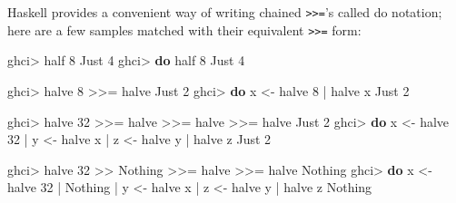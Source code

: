 \documentclass[]{article}
\newenvironment{Shaded}{}{}
\newcommand{\DataTypeTok}[1]{\textcolor[rgb]{0.56,0.13,0.00}{#1}}
\newcommand{\DecValTok}[1]{\textcolor[rgb]{0.25,0.63,0.44}{#1}}
\newcommand{\KeywordTok}[1]{\textcolor[rgb]{0.00,0.44,0.13}{\textbf{#1}}}
\newcommand{\NormalTok}[1]{#1}
\newcommand{\OperatorTok}[1]{\textcolor[rgb]{0.40,0.40,0.40}{#1}}
\newcommand{\OtherTok}[1]{\textcolor[rgb]{0.00,0.44,0.13}{#1}}
\begin{document}
Haskell provides a convenient way of writing chained
\texttt{\textgreater{}\textgreater{}=}'s called do notation; here are a few
samples matched with their equivalent \texttt{\textgreater{}\textgreater{}=}
form:

\begin{Shaded}
\begin{Highlighting}[]
\NormalTok{ghci}\OperatorTok{\textgreater{}}\NormalTok{ half }\DecValTok{8}
\DataTypeTok{Just} \DecValTok{4}
\NormalTok{ghci}\OperatorTok{\textgreater{}} \KeywordTok{do}\NormalTok{  half }\DecValTok{8}
\DataTypeTok{Just} \DecValTok{4}

\NormalTok{ghci}\OperatorTok{\textgreater{}}\NormalTok{ halve }\DecValTok{8} \OperatorTok{\textgreater{}\textgreater{}=}\NormalTok{ halve}
\DataTypeTok{Just} \DecValTok{2}
\NormalTok{ghci}\OperatorTok{\textgreater{}} \KeywordTok{do}\NormalTok{  x }\OtherTok{\textless{}{-}}\NormalTok{ halve }\DecValTok{8}
    \OperatorTok{|}\NormalTok{     halve x}
\DataTypeTok{Just} \DecValTok{2}

\NormalTok{ghci}\OperatorTok{\textgreater{}}\NormalTok{ halve }\DecValTok{32} \OperatorTok{\textgreater{}\textgreater{}=}\NormalTok{ halve }\OperatorTok{\textgreater{}\textgreater{}=}\NormalTok{ halve }\OperatorTok{\textgreater{}\textgreater{}=}\NormalTok{ halve}
\DataTypeTok{Just} \DecValTok{2}
\NormalTok{ghci}\OperatorTok{\textgreater{}} \KeywordTok{do}\NormalTok{  x }\OtherTok{\textless{}{-}}\NormalTok{ halve }\DecValTok{32}
    \OperatorTok{|}\NormalTok{     y }\OtherTok{\textless{}{-}}\NormalTok{ halve x}
    \OperatorTok{|}\NormalTok{     z }\OtherTok{\textless{}{-}}\NormalTok{ halve y}
    \OperatorTok{|}\NormalTok{     halve z}
\DataTypeTok{Just} \DecValTok{2}

\NormalTok{ghci}\OperatorTok{\textgreater{}}\NormalTok{ halve }\DecValTok{32} \OperatorTok{\textgreater{}\textgreater{}} \DataTypeTok{Nothing} \OperatorTok{\textgreater{}\textgreater{}=}\NormalTok{ halve }\OperatorTok{\textgreater{}\textgreater{}=}\NormalTok{ halve}
\DataTypeTok{Nothing}
\NormalTok{ghci}\OperatorTok{\textgreater{}} \KeywordTok{do}\NormalTok{  x }\OtherTok{\textless{}{-}}\NormalTok{ halve }\DecValTok{32}
    \OperatorTok{|}     \DataTypeTok{Nothing}
    \OperatorTok{|}\NormalTok{     y }\OtherTok{\textless{}{-}}\NormalTok{ halve x}
    \OperatorTok{|}\NormalTok{     z }\OtherTok{\textless{}{-}}\NormalTok{ halve y}
    \OperatorTok{|}\NormalTok{     halve z}
\DataTypeTok{Nothing}
\end{Highlighting}
\end{Shaded}
\end{document}
